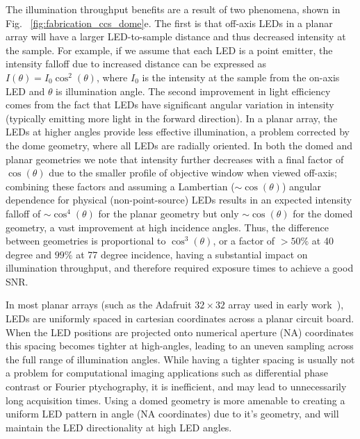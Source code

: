 The illumination throughput benefits are a result of two phenomena, shown in Fig. ~\ref{fig:fabrication_ccs_dome}e. The first is that off-axis LEDs in a planar array will have a larger LED-to-sample distance and thus decreased intensity at the sample. For example, if we assume that each LED is a point emitter, the intensity falloff due to increased distance can be expressed as $I(\theta) = I_0 \cos^2(\theta)$, where $I_0$ is the intensity at the sample from the on-axis LED and $\theta$ is illumination angle. The second improvement in light efficiency comes from the fact that LEDs have significant angular variation in intensity (typically emitting more light in the forward direction). In a planar array, the LEDs at higher angles provide less effective illumination, a problem corrected by the dome geometry, where all LEDs are radially oriented. In both the domed and planar geometries we note that intensity further decreases with a final factor of $\cos(\theta)$ due to the smaller profile of objective window when viewed off-axis; combining these factors and assuming a Lambertian ($\sim\cos(\theta)$) angular dependence for physical (non-point-source) LEDs results in an expected intensity falloff of $\sim\cos^4(\theta)$ for the planar geometry but only $\sim\cos(\theta)$ for the domed geometry, a vast improvement at high incidence angles. Thus, the difference between geometries is proportional to $\cos^{3}(\theta)$, or a factor of $> 50 \%$ at 40 degree and $99\%$ at 77 degree incidence, having a substantial impact on illumination throughput, and therefore required exposure times to achieve a good SNR.

In most planar arrays (such as the Adafruit $32 \times 32$ array used in early work~\cite{Zheng2013, Zheng2011}), LEDs are uniformly spaced in cartesian coordinates across a planar circuit board. When the LED positions are projected onto numerical aperture (NA) coordinates this spacing becomes tighter at high-angles, leading to an uneven sampling across the full range of illumination angles. While having a tighter spacing is usually not a problem for computational imaging applications such as differential phase contrast or Fourier ptychography, it is inefficient, and may lead to unnecessarily long acquisition times. Using a domed geometry is more amenable to creating a uniform LED pattern in angle (NA coordinates) due to it's geometry, and will maintain the LED directionality at high LED angles.


